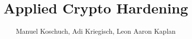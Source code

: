 \documentclass{llncs}
\begin{document}
\title{Applied Crypto Hardening}

\author{ Manuel Koschuch, Adi Kriegisch, Leon Aaron Kaplan}


\maketitle













\end{document}
